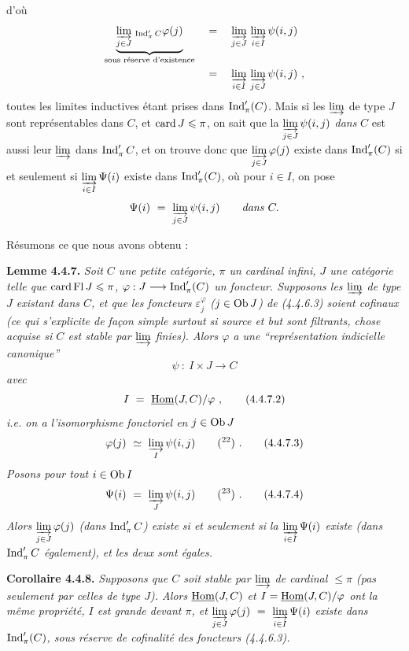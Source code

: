 d'où
\[
\begin{aligned}
\underbrace{\varinjlim_{j\in J}{}_{\,\operatorname{Ind}'_\pi C}\varphi(j)}_{\text{sous réserve d'existence}} \quad &= \quad \varinjlim_{j\in J}\, \varinjlim_{i\in I} \psi(i,j)\\
&= \quad \varinjlim_{i\in I}\, \varinjlim_{j\in J} \psi(i,j)\ ,
\end{aligned}
\]
toutes les limites inductives étant prises dans $\operatorname{Ind}'_\pi(C)$. Mais si les $\varinjlim$ de type $J$ sont représentables dans $C$, et $\operatorname{card} J \leqslant \pi$, on sait que la $\varinjlim\limits_{j\in J} \psi(i,j)$ \textit{dans} $C$ est aussi leur $\varinjlim$ dans $\operatorname{Ind}'_\pi C$, et on trouve donc que $\varinjlim\limits_{j\in J} \varphi(j)$ existe dans $\operatorname{Ind}'_\pi(C)$ si et seulement si $\varinjlim\limits_{i\in I} \Psi(i)$ existe dans $\operatorname{Ind}'_\pi(C)$, où pour $i \in I$, on pose
\[
\Psi(i) \ =\ \varinjlim_{j\in J} \psi(i,j) \qquad \textit{dans } C.
\]

Résumons ce que nous avons obtenu :

\textbf{Lemme 4.4.7.} \textit{Soit $C$ une petite catégorie, $\pi$ un cardinal infini, $J$ une catégorie telle que $\operatorname{card} \operatorname{Fl} J \leqslant \pi$, $\varphi : J \longrightarrow \operatorname{Ind}'_\pi(C)$ un foncteur. Supposons les $\varinjlim$ de type $J$ existant dans $C$, et que les foncteurs $\varepsilon_j^\varphi$ ($j \in \mathrm{Ob}\, J$) de (4.4.6.3) soient \textup{cofinaux} (ce qui s'explicite de façon simple surtout si source et but sont filtrants, chose acquise si $C$ est stable par $\varinjlim$ finies). Alors $\varphi$ a une “représentation indicielle canonique”}
\[
\psi \ :\ I \times J \longrightarrow C \tag*{(4.4.7.1)}
\]
\textit{avec}
\[
I \ =\ \uHom(J,C)/\varphi\ , \tag*{(4.4.7.2)}
\]
\textit{i.e. on a l'isomorphisme fonctoriel en $j \in \mathrm{Ob}\, J$}
\[
\varphi(j) \ \simeq\ \varinjlim_{I} \psi(i,j) \qquad (\text{\footnotemark[22]})\ . \tag*{(4.4.7.3)}
\]
\textit{Posons pour tout $i \in \mathrm{Ob}\, I$}
\[
\Psi(i) \ =\ \varinjlim_{J} \psi(i,j) \qquad (\text{\footnotemark[23]})\ . \tag*{(4.4.7.4)}
\]
\textit{Alors $\varinjlim\limits_{j\in J} \varphi(j)$ (dans $\operatorname{Ind}'_\pi C$) existe si et seulement si}
\textit{la $\varinjlim\limits_{i\in I} \Psi(i)$ existe (dans $\operatorname{Ind}'_\pi C$ également), et les deux sont égales.}

\textbf{Corollaire 4.4.8.} \textit{Supposons que $C$ soit stable par $\varinjlim$ de cardinal $\leqslant \pi$ (pas seulement par celles de type $J$). Alors $\underline{\mathrm{Hom}}(J,C)$ et $I = \underline{\mathrm{Hom}}(J,C)/\varphi$ ont la même propriété, $I$ est grande devant $\pi$, et $\varinjlim\limits_{j\in J} \varphi(j) \ =\ \varinjlim\limits_{i\in I} \Psi(i)$ existe dans $\operatorname{Ind}'_\pi(C)$, sous réserve de cofinalité des foncteurs (4.4.6.3).}

